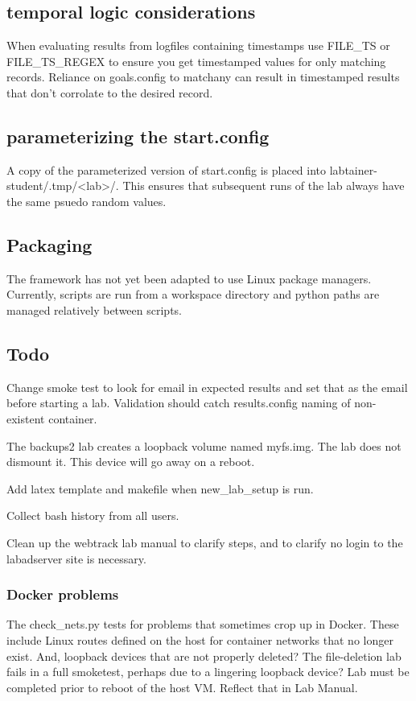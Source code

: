 \documentclass[12pt]{article}
\begin{document}
\subsection {temporal logic considerations}
When evaluating results from logfiles containing timestamps use FILE\_TS or FILE\_TS\_REGEX
to ensure you get timestamped values for only matching records. Reliance on goals.config to
matchany can result in timestamped results that don't corrolate to the desired record. 

\subsection {parameterizing the start.config}
A copy of the parameterized version of start.config is placed into 
labtainer-student/.tmp/<lab>/.  This ensures that subsequent runs of the lab always
have the same psuedo random values.

\subsection {Packaging}
The framework has not yet been adapted to use Linux package managers.
Currently, scripts are run from a workspace directory and python
paths are managed relatively between scripts.  

\subsection{Todo}
Change smoke test to look for email in expected results and set that as the email before starting a lab.
Validation should catch results.config naming of non-existent container.

The backups2 lab creates a loopback volume named myfs.img.  The lab does not dismount it.
This device will go away on a reboot.

Add latex template and makefile when new\_lab\_setup is run.

Collect bash history from all users.

Clean up the webtrack lab  manual to clarify steps, and to clarify no login to the labadserver site 
is necessary.

\subsubsection{Docker problems}
The check\_nets.py tests for problems that sometimes crop up in Docker.  These include Linux routes defined
on the host for container networks that no longer exist.  And, loopback devices that are not properly deleted?
The file-deletion lab fails in a full smoketest, perhaps due to a lingering loopback device?
Lab must be completed prior to reboot of the host VM. Reflect that in Lab Manual.
\end{document}
